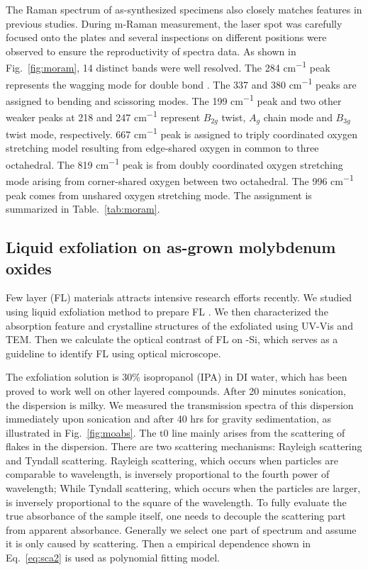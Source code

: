 The Raman spectrum of as-synthesized specimens also closely matches  features in previous studies.\cite{Dixit1986,Silveira2012} During m-Raman measurement, the laser spot was carefully focused onto the plates and several inspections on different positions were observed to ensure the reproductivity of spectra data. As shown in Fig.~\ref{fig:moram}, 14 distinct bands were well resolved. The 284 \si{cm^{-1}} peak represents the wagging mode for double bond . The 337 and 380  \si{cm^{-1}} peaks are assigned to  bending and scissoring modes. The 199 \si{cm^{-1}} peak and two other weaker peaks at 218 and 247 \si{cm^{-1}} represent  $B_{2g}$ twist, $A_g$ chain mode and  $B_{3g}$ twist mode, respectively. 667 \si{cm^{-1}} peak is assigned to triply coordinated oxygen stretching model resulting from edge-shared oxygen in common to three octahedral. The 819 \si{cm^{-1}} peak is from doubly coordinated oxygen stretching mode arising from corner-shared oxygen between two octahedral. The 996 \si{cm^{-1}} peak comes from unshared oxygen stretching mode.\cite{Siciliano2009} The assignment is summarized in Table.~\ref{tab:moram}.


\subsection{Liquid exfoliation on as-grown molybdenum oxides}

Few layer (FL) materials attracts intensive research efforts recently. We studied using liquid exfoliation method to prepare FL . We then characterized the absorption feature and crystalline structures of the exfoliated  using UV-Vis and TEM. Then we calculate the optical contrast of FL  on -Si, which serves as a guideline to identify FL  using optical microscope.

The exfoliation solution is 30\% isopropanol (IPA) in DI water, which has been proved to work well on other layered compounds.\cite{Halim2013} After 20 minutes sonication, the dispersion is milky. We measured the transmission spectra of this dispersion immediately upon sonication and after 40 hrs for gravity sedimentation, as illustrated in Fig.~\ref{fig:moabs}. The t0 line mainly arises from the scattering of flakes in the dispersion. There are two scattering mechanisms: Rayleigh scattering and Tyndall scattering. Rayleigh scattering, which occurs when particles are comparable to wavelength, is inversely proportional to the fourth power of wavelength; While Tyndall scattering, which occurs when the particles are larger, is inversely proportional to the square of the wavelength. To fully evaluate the true absorbance of the sample itself, one needs to decouple the scattering part from apparent absorbance. Generally we select one part of spectrum and assume it is only caused by scattering. Then a empirical dependence shown in Eq.~\ref{eq:sca2} is used as polynomial fitting model.

